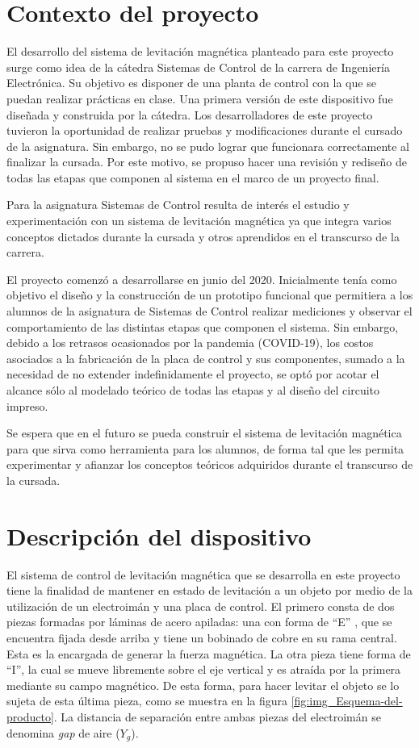\section{Contexto del proyecto}

El desarrollo del sistema de levitación magnética planteado para este proyecto surge como idea de la cátedra Sistemas de Control de la carrera de Ingeniería Electrónica. Su objetivo es disponer de una planta de control con la  que se puedan realizar prácticas en clase. Una primera versión de este dispositivo fue diseñada y construida por la cátedra. Los desarrolladores de este proyecto tuvieron la oportunidad de realizar pruebas y modificaciones durante el cursado de la asignatura. Sin embargo, no se pudo lograr que funcionara correctamente al finalizar la cursada. Por este motivo, se propuso hacer una revisión y rediseño de todas las etapas que componen al sistema en el marco de un proyecto final.

Para la asignatura Sistemas de Control resulta de interés el estudio y experimentación con un sistema de levitación magnética ya que integra varios conceptos dictados durante la cursada y otros aprendidos en el transcurso de la carrera. 

El proyecto comenzó a desarrollarse en junio del 2020. Inicialmente tenía como objetivo el diseño y la construcción de un prototipo funcional que permitiera a los alumnos de la asignatura de Sistemas de Control realizar mediciones y observar el comportamiento de las distintas etapas que componen el sistema. Sin embargo, debido a los retrasos ocasionados por la pandemia (COVID-19), los costos asociados a la fabricación de la placa de control y sus componentes, sumado a la  necesidad de no extender indefinidamente el proyecto, se optó por acotar el alcance sólo al modelado teórico de todas las etapas y al diseño del circuito impreso.

Se espera que en el futuro se pueda construir el sistema de levitación magnética para que sirva como herramienta para los alumnos, de forma tal que les permita experimentar y afianzar los conceptos teóricos adquiridos durante el transcurso de la cursada.


\section{Descripción del dispositivo}
El sistema de control de levitación magnética que se desarrolla en este proyecto tiene la finalidad de mantener en estado de levitación a un objeto por medio de la utilización de un electroimán y una placa de control. El primero consta de dos piezas formadas por láminas de acero apiladas: una con forma de “E” , que se encuentra fijada desde arriba y tiene un bobinado de cobre en su rama central. Esta es la encargada de generar la fuerza magnética. La otra pieza tiene forma de “I”, la cual se mueve libremente sobre el eje vertical y es atraída por la primera mediante su campo magnético. De esta forma, para hacer levitar el objeto se lo sujeta de esta última pieza, como se muestra en la figura \ref{fig:img_Esquema-del-producto}. La distancia de separación entre ambas piezas del electroimán se denomina  \textsl{gap} de aire ($Y_{g}$).


